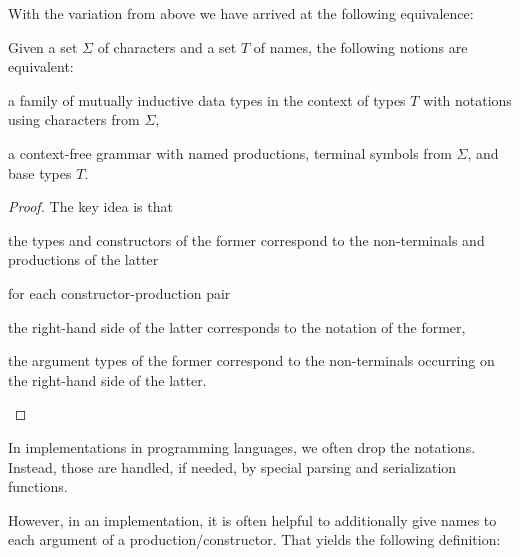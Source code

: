 With the variation from above we have arrived at the following equivalence:

\begin{theorem}
Given a set $\Sigma$ of characters and a set $T$ of names, the following notions are equivalent:
\begin{compactitem}
\item a family of mutually inductive data types in the context of types $T$ with notations using characters from $\Sigma$,
\item a context-free grammar with named productions, terminal symbols from $\Sigma$, and base types $T$.
\end{compactitem}
\end{theorem}
\begin{proof}
The key idea is that
\begin{compactitem}
 \item the types and constructors of the former correspond to the non-terminals and productions of the latter
 \item for each constructor-production pair
  \begin{compactitem}
   \item the right-hand side of the latter corresponds to the notation of the former,
   \item the argument types of the former correspond to the non-terminals occurring on the right-hand side of the latter.
  \end{compactitem}
\end{compactitem}
\end{proof}

In implementations in programming languages, we often drop the notations.
Instead, those are handled, if needed, by special parsing and serialization functions.

However, in an implementation, it is often helpful to additionally give names to each argument of a production/constructor.
That yields the following definition:

